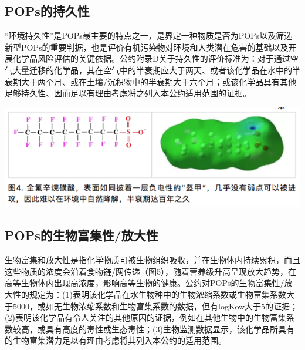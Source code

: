 \documentclass[
]{book}
\begin{document}
\hypertarget{popsux7684ux6301ux4e45ux6027}{%
\subsection{POPs的持久性}\label{popsux7684ux6301ux4e45ux6027}}

``环境持久性''是POPs最主要的特点之一，是界定一种物质是否为POPs以及筛选新型POPs的重要判据，也是评价有机污染物对环境和人类潜在危害的基础以及开展化学品风险评估的关键依据。公约附录D关于持久性的评价标准为：对于通过空气大量迁移的化学品，其在空气中的半衰期应大于两天、或者该化学品在水中的半衰期大于两个月、或在土壤/沉积物中的半衰期大于六个月；或该化学品具有其他足够持久性、因而足以有理由考虑将之列入本公约适用范围的证据。

\includegraphics[width=8.33in]{images/gongyue4}

\hypertarget{popsux7684ux751fux7269ux5bccux96c6ux6027ux653eux5927ux6027}{%
\subsection{POPs的生物富集性/放大性}\label{popsux7684ux751fux7269ux5bccux96c6ux6027ux653eux5927ux6027}}

生物富集和放大性是指化学物质可被生物组织吸收，并在生物体内持续累积，而且这些物质的浓度会沿着食物链/网传递（图5），随着营养级升高呈现放大趋势，在高等生物体内出现高浓度，影响高等生物的健康。公约对POPs的生物富集性/放大性的规定为：(1)表明该化学品在水生物种中的生物浓缩系数或生物富集系数大于5000，或如无生物浓缩系数和生物富集系数的数据，但有logKow大于5的证据；(2)表明该化学品有令人关注的其他原因的证据，例如在其他生物中的生物富集系数较高，或具有高度的毒性或生态毒性；(3)生物监测数据显示，该化学品所具有的生物富集潜力足以有理由考虑将其列入本公约的适用范围。
\end{document}
